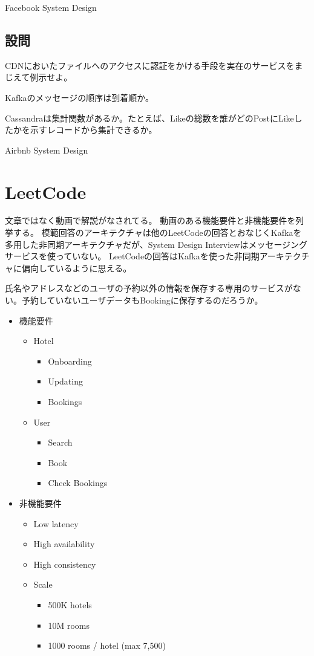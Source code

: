 \documentclass[book]{jlreq}
\begin{document}
\begin{chapter-bib}{Facebook System Design}
  \subsection{設問}
  \begin{exercise}
  \item CDNにおいたファイルへのアクセスに認証をかける手段を実在のサービスをまじえて例示せよ。
  \item Kafkaのメッセージの順序は到着順か。
  \item Cassandraは集計関数があるか。たとえば、Likeの総数を誰がどのPostにLikeしたかを示すレコードから集計できるか。
  \end{exercise}
\end{chapter-bib}
\begin{chapter-bib}{Airbnb System Design}
  \section{LeetCode}
  文章ではなく動画で解説がなされてる\cite{lc-airbnb}。
  動画のある機能要件と非機能要件を列挙する。
  模範回答のアーキテクチャは他のLeetCodeの回答とおなじくKafkaを多用した非同期アーキテクチャだが、System Design Interviewはメッセージングサービスを使っていない\cite{sdi2}。
  LeetCodeの回答はKafkaを使った非同期アーキテクチャに偏向しているように思える。

  氏名やアドレスなどのユーザの予約以外の情報を保存する専用のサービスがない。予約していないユーザデータもBookingに保存するのだろうか。
  \begin{itemize}
  \item 機能要件
    \begin{itemize}
    \item Hotel
      \begin{itemize}
      \item Onboarding
      \item Updating
      \item Bookings
      \end{itemize}
    \item User
      \begin{itemize}
      \item Search
      \item Book
      \item Check Bookings
      \end{itemize}
    \end{itemize}
  \item 非機能要件
    \begin{itemize}
    \item Low latency
    \item High availability
    \item High consistency
    \item Scale
      \begin{itemize}
      \item 500K hotels
      \item 10M rooms
      \item 1000 rooms / hotel (max 7,500)
      \end{itemize}
    \end{itemize}
  \end{itemize}

\end{chapter-bib}
\end{document}
